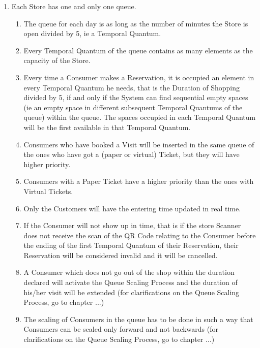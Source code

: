 \documentclass[a4paper, 10pt, oneside]{article}
\begin{document}
\begin{enumerate}[align=left, label={R.\arabic{*}}]
    
    \item \label{req:queueUnique}Each Store has one and only one queue.
    \begin{enumerate}[label={-}]
        \item \label{req:codeUnique:queueVector} The queue for each day is as long as the number of minutes the Store is open divided by 5, ie a Temporal Quantum.
        \item \label{req:codeUnique:vectorOfVectors} Every Temporal Quantum of the queue contains as many elements as the capacity of the Store.
        \item \label{req:codeUnique:queueReservations} Every time a Consumer makes a Reservation, it is occupied an element in every Temporal Quantum he needs, that is the Duration of Shopping divided by 5, if and only if the System can find sequential empty spaces (ie an empty space in different subsequent Temporal Quantums of the queue) within the queue. The spaces occupied in each Temporal Quantum will be the first available in that Temporal Quantum.
        \item \label{req:codeUnique:visitsAndQueue} Consumers who have booked a Visit will be inserted in the same queue of the ones who have got a (paper or virtual) Ticket, but they will have higher priority.
        \item \label{req:codeUnique:ticketsAndQueue} Consumers with a Paper Ticket have a higher priority than the ones with Virtual Tickets.
        \item Only the Customers will have the entering time updated in real time. %
        \item \label{req:codeUnique:invalidateLate} If the Consumer will not show up in time, that is if the store Scanner does not receive the scan of the QR Code relating to the Consumer before the ending of the first Temporal Quantum of their Reservation, their Reservation will be considered invalid and it will be cancelled.
        \item \label{req:codeUnique:exeedDuration} A Consumer which does not go out of the shop within the duration declared will activate the Queue Scaling Process and the duration of his/her visit will be extended (for clarifications on the Queue Scaling Process, go to chapter ...)
        \item \label{req:codeUnique:queueScaling} The scaling of Consumers in the queue has to be done in such a way that Consumers can be scaled only forward and not backwards (for clarifications on the Queue Scaling Process, go to chapter ...)

\end{enumerate}
\end{enumerate}
\end{document}
